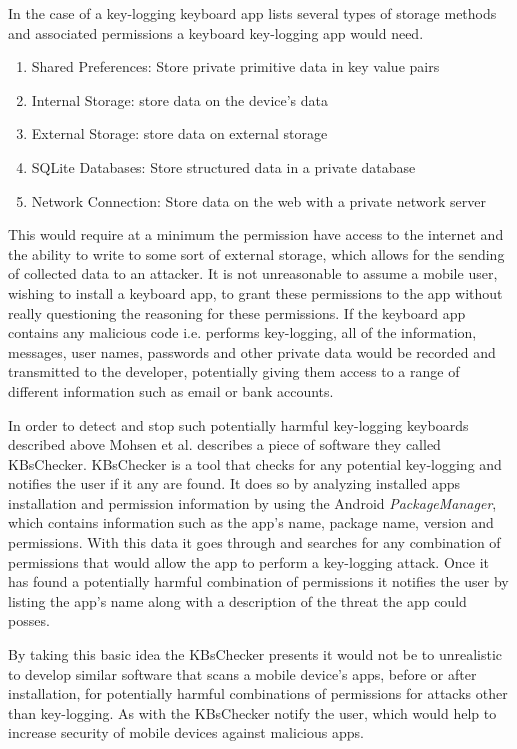 \documentclass{sig-alternate}
\begin{document}
	  In the case of a key-logging keyboard app \cite{Keylogging} lists several types of storage methods and associated permissions a keyboard key-logging app would need.
	\begin{enumerate}
	\item Shared Preferences: Store private primitive data in key value pairs
	\item Internal Storage: store data on the device's data
	\item External Storage: store data on external storage
	\item SQLite Databases: Store structured data in a private database
	\item Network Connection: Store data on the web with a private network server
	\end{enumerate} 
	 
This would require at a minimum the permission have access to the internet and the ability to write to some sort of external storage, which allows for the sending of collected data to an attacker. It is not unreasonable to assume a mobile user, wishing to install a keyboard app, to grant these permissions to the app without really questioning the reasoning for these permissions. If the keyboard app contains any malicious code i.e. performs key-logging, all of the information, messages, user names, passwords and other private data would be recorded and transmitted to the developer, potentially giving them access to a range of different information such as email or bank accounts.

In order to detect and stop such potentially harmful key-logging keyboards described above Mohsen et al. \cite{Keylogging} describes a piece of software they called KBsChecker. KBsChecker is a tool that checks for any potential key-logging and notifies the user if it any are found. It does so by analyzing installed apps installation and permission information by using the Android \textit{PackageManager}, which contains information such as the app's name, package name, version and permissions. With this data it goes through and searches for any combination of permissions that would allow the app to perform a key-logging attack. Once it has found a potentially harmful combination of permissions it notifies the user by listing the app's name along with a description of the threat the app could posses.

 By taking this basic idea the KBsChecker presents it would not be to unrealistic to develop similar software that scans a mobile device's apps, before or after installation, for potentially harmful combinations of permissions for attacks other than key-logging. As with the KBsChecker notify the user, which would help to increase security of mobile devices against malicious apps.   \\ 
\end{document}
